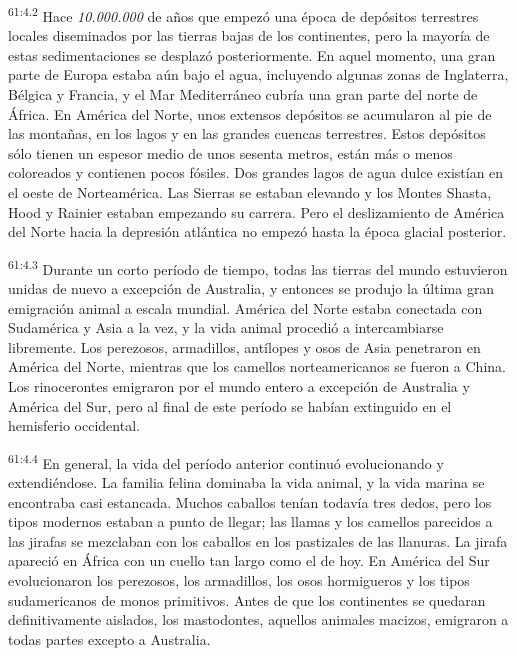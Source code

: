 \par
\textsuperscript{61:4.2} Hace \textit{10.000.000} de años que empezó una época de depósitos terrestres locales diseminados por las tierras bajas de los continentes, pero la mayoría de estas sedimentaciones se desplazó posteriormente. En aquel momento, una gran parte de Europa estaba aún bajo el agua, incluyendo algunas zonas de Inglaterra, Bélgica y Francia, y el Mar Mediterráneo cubría una gran parte del norte de África. En América del Norte, unos extensos depósitos se acumularon al pie de las montañas, en los lagos y en las grandes cuencas terrestres. Estos depósitos sólo tienen un espesor medio de unos sesenta metros, están más o menos coloreados y contienen pocos fósiles. Dos grandes lagos de agua dulce existían en el oeste de Norteamérica. Las Sierras se estaban elevando y los Montes Shasta, Hood y Rainier estaban empezando su carrera. Pero el deslizamiento de América del Norte hacia la depresión atlántica no empezó hasta la época glacial posterior.

\par
\textsuperscript{61:4.3} Durante un corto período de tiempo, todas las tierras del mundo estuvieron unidas de nuevo a excepción de Australia, y entonces se produjo la última gran emigración animal a escala mundial. América del Norte estaba conectada con Sudamérica y Asia a la vez, y la vida animal procedió a intercambiarse libremente. Los perezosos, armadillos, antílopes y osos de Asia penetraron en América del Norte, mientras que los camellos norteamericanos se fueron a China. Los rinocerontes emigraron por el mundo entero a excepción de Australia y América del Sur, pero al final de este período se habían extinguido en el hemisferio occidental.

\par
\textsuperscript{61:4.4} En general, la vida del período anterior continuó evolucionando y extendiéndose. La familia felina dominaba la vida animal, y la vida marina se encontraba casi estancada. Muchos caballos tenían todavía tres dedos, pero los tipos modernos estaban a punto de llegar; las llamas y los camellos parecidos a las jirafas se mezclaban con los caballos en los pastizales de las llanuras. La jirafa apareció en
África con un cuello tan largo como el de hoy. En América del Sur evolucionaron los perezosos, los armadillos, los osos hormigueros y los tipos sudamericanos de monos primitivos. Antes de que los continentes se quedaran definitivamente aislados, los mastodontes, aquellos animales macizos, emigraron a todas partes excepto a Australia.

